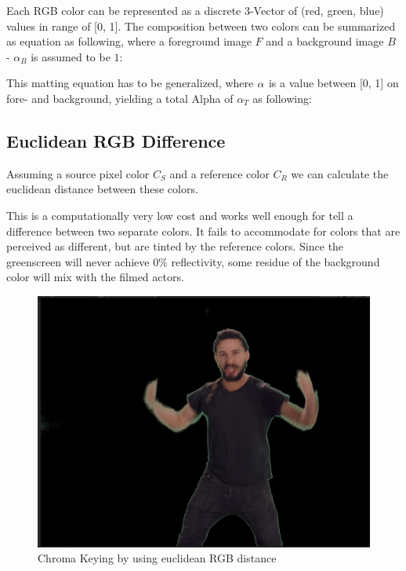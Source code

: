 Each RGB color can be represented as a discrete 3-Vector of (red, green, blue) 
values in range of [0, 1]. The composition between two colors can be summarized 
as equation as following, where a foreground image $F$ and a background 
image $B$ - $\alpha_B$ is assumed to be $1$:


This matting equation has to be generalized, where $\protect\alpha$ is a value 
between [0, 1] on fore- and background, yielding a total Alpha of $\alpha_T$ as 
following:



\subsection{Euclidean RGB Difference}
Assuming a source pixel color $C_S$ and a reference color $C_R$ we can 
calculate the euclidean distance between these colors.

This is a computationally very low cost and works well enough for tell a 
difference between two separate colors. It fails to accommodate for colors that 
are perceived as different, but are tinted by the reference colors. Since the 
greenscreen will never achieve 0\% reflectivity, some residue of the background 
color will mix with the filmed actors.

\begin{figure}[htb]
	\includegraphics[width=\textwidth]{_raw_resources/Comparison_RGB_color.png}
	\caption{Chroma Keying by using euclidean RGB distance}
	\label{fig:chroma:euclidean:rgb}
\end{figure}

